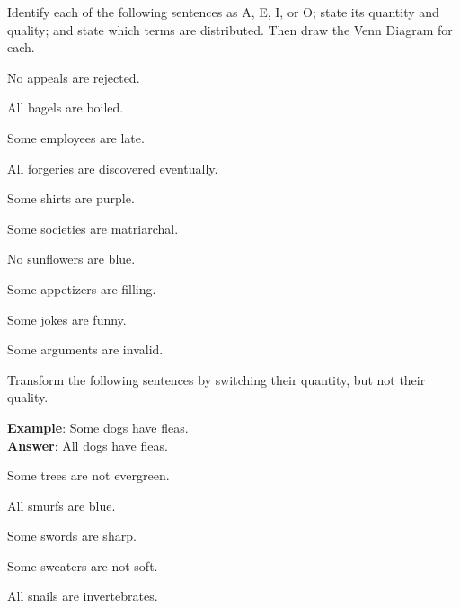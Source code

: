 \pagebreak

\noindent \problempart Identify each of the following sentences as A, E, I, or O; state its quantity and quality; and state which terms are distributed. Then draw the Venn Diagram for each.

\begin{exercises}
\item No appeals are rejected.
\item All bagels are boiled.
\item Some employees are late.
\item All forgeries are discovered eventually.
\item Some shirts are purple.
\item Some societies are matriarchal.
\item No sunflowers are blue.
\item Some appetizers are filling. 
\item Some jokes are funny.
\item Some arguments are invalid. 
\end{exercises}

\noindent\problempart Transform the following sentences by switching their quantity, but not their quality.

\textbf{Example}: Some dogs have fleas. \\
\textbf{Answer}: All dogs have fleas.

\begin{exercises}
\item Some trees are not evergreen. 


\item All smurfs are blue. 


\item Some swords are sharp. 


\item Some sweaters are not soft. 


\item All snails are invertebrates. 


\end{exercises}


